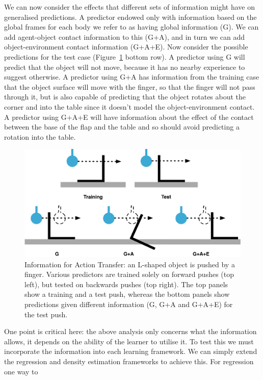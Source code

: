 We can now consider the effects that different sets of information
might have on generalised predictions. A predictor endowed only with
information based on the global frames for each body we refer to as
having global information (G). We can add agent-object contact
information to this (G+A), and in turn we can add object-environment
contact information (G+A+E). Now consider the possible predictions for the test case (Figure~\ref{fig:ToyExample} bottom row). A predictor
using G will predict that the object will not move, because it has no
nearby experience to suggest otherwise. A predictor using G+A has
information from the training case that the object surface will move
with the finger, so that the finger will not pass through it, but is
also capable of predicting that the object rotates about the corner
and into the table since it doesn't model the object-environment
contact. A predictor using G+A+E will have information about the
effect of the contact between the base of the flap and the table and
so should avoid predicting a rotation into the table.
\begin{figure}[b]
\centerline{\includegraphics[width=\columnwidth]{BackPushToyExample}}
\caption[ToyExample]{Information for Action Transfer: an L-shaped object is pushed by a finger. Various predictors are trained solely on forward pushes (top left), but tested on backwards pushes (top right). The top panels show a training and a test push, whereas the bottom panels show predictions given different information (G, G+A and G+A+E) for the test push.}
\label{fig:ToyExample}
\end{figure}
One point is critical here: the above analysis only concerns what the
information allows, it depends on the ability of the learner to
utilise it.  To test this we must incorporate the information into
each learning framework. We can simply extend the regression and density
estimation frameworks to achieve this. For regression one way to
